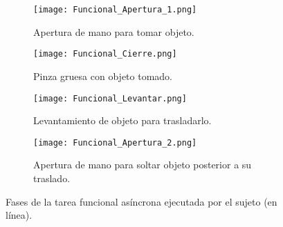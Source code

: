 \begin{figure}[htbp]
	\centering
	\begin{subfigure}[htbp]{0.45\textwidth}
		\texttt{[image: Funcional\_Apertura\_1.png]}
		\caption{Apertura de mano para tomar objeto.}
		\label{Figura: Fun_A_1}
	\end{subfigure}
	\begin{subfigure}[htbp]{0.45\textwidth}
		\texttt{[image: Funcional\_Cierre.png]}
		\caption{Pinza gruesa con objeto tomado.}
		\label{Figura: Fun_C}
	\end{subfigure}
	\newline
	\begin{subfigure}[htbp]{0.45\textwidth}
		\texttt{[image: Funcional\_Levantar.png]}
		\caption{Levantamiento de objeto para trasladarlo.}
		\label{Figura: Fun_L}
	\end{subfigure}
	\begin{subfigure}[htbp]{0.45\textwidth}
		\texttt{[image: Funcional\_Apertura\_2.png]}
		\caption{Apertura de mano para soltar objeto posterior a su traslado.}
		\label{Figura: Fun_A_2}
	\end{subfigure}
	\caption{Fases de la tarea funcional asíncrona ejecutada por el sujeto (en línea).}
	\label{Figura: TareaFuncional}
\end{figure}




